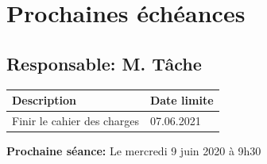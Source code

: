 \documentclass[11pt]{meetingmins}
\begin{document}
\section{Prochaines échéances}
\subsection{Responsable: M. Tâche}

\begin{table}[ht]
    \begin{tabularx}{\columnwidth}{ | X | p{8em} |}
        \hline
        \textbf{Description} & \textbf{Date limite} \\
        \hline
        Finir le cahier des charges & 07.06.2021 \\
        \hline
    \end{tabularx}
\end{table}

\vspace{1em}
\par \noindent \textbf {Prochaine séance:} Le mercredi 9 juin 2020 à 9h30
\end{document}
